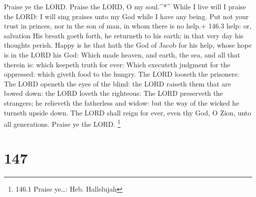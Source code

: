  Praise ye the LORD. Praise the LORD, O my soul.\^{}*\^{}
 While I live will I praise the LORD: I will sing praises
unto my God while I have any being.  Put not your trust in
princes, nor in the son of man, in whom there is no help.+ 146.3 help:
or, salvation  His breath goeth forth, he returneth to his
earth; in that very day his thoughts perish.  Happy is he
that hath the God of Jacob for his help, whose hope is in the LORD his
God:  Which made heaven, and earth, the sea, and all that
therein is: which keepeth truth for ever:  Which executeth
judgment for the oppressed: which giveth food to the hungry. The LORD
looseth the prisoners:  The LORD openeth the eyes of the
blind: the LORD raiseth them that are bowed down: the LORD loveth the
righteous:  The LORD preserveth the strangers; he relieveth
the fatherless and widow: but the way of the wicked he turneth upside
down.  The LORD shall reign for ever, even thy God, O Zion,
unto all generations. Praise ye the LORD. \footnote{146.1 Praise
  ye\ldots: Heb. Hallelujah}

\hypertarget{section-147}{%
\section{147}\label{section-147}}

